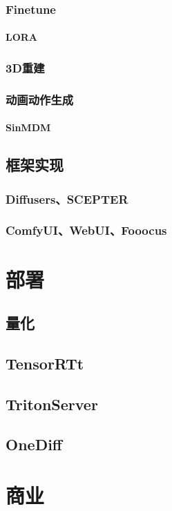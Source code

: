 \documentclass[lang=cn,newtx,10pt,scheme=chinese]{elegantbook}
\begin{document}
\subsection{Finetune}
\subsubsection{LORA}
\subsection{3D重建}
\subsection{动画动作生成}
\subsubsection{SinMDM}

\section{框架实现}
\subsection{Diffusers、SCEPTER}
\subsection{ComfyUI、WebUI、Fooocus}


\chapter{部署}
\section{量化}
\section{TensorRTt}
\section{TritonServer}
\section{OneDiff}

\chapter{商业}
\end{document}
